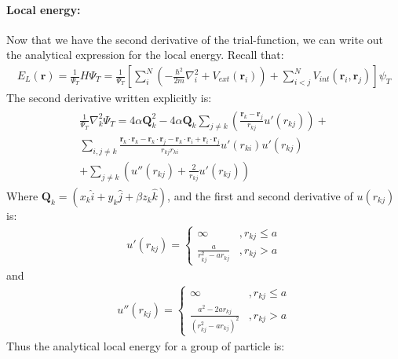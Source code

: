 \documentclass[a4paper, 10pt]{article}
\begin{document}
\begin{appendices}
		\paragraph{Local energy:} Now that we have the second derivative of the
		trial-function, we can write out the analytical expression for the local energy.
		Recall that:
		\begin{align}
		E_{L}(\boldsymbol{r}) = \frac{1}{\Psi_{T}}H\Psi_{T} =
		\frac{1}{\Psi_{T}}\left[\sum_{i}^{N}\left(-\frac{\hbar^{2}}{2m}\nabla^{2}_{i}
		+ V_{ext}(\boldsymbol{r}_{i})\right) + \sum_{i < j}^{N}V_{int}(
		\boldsymbol{r}_{i},\boldsymbol{r}_{j})\right]\psi_{T}
		\end{align}
		The second derivative written explicitly is:
		\begin{align}
		\begin{split}
		\frac{1}{\Psi_{T}}\nabla^{2}_{k}\Psi_{T} = 4\alpha\boldsymbol{Q}_{k}^{2} - 4\alpha\boldsymbol{Q}_{k}
		\sum_{j\neq k}\left(\frac{\boldsymbol{r}_{k} - \boldsymbol{r}_{j}}{r_{kj}}u'(r_{kj})\right)
		+\\
		\sum_{i,j\neq k}\frac{\boldsymbol{r}_{k}\cdot\boldsymbol{r}_{k} - \boldsymbol{r}_{k}\cdot\boldsymbol{r}_{j} - \boldsymbol{r}_{k}\cdot\boldsymbol{r}_{i} + \boldsymbol{r}_{i}\cdot\boldsymbol{r}_{j}}{r_{kj}r_{ki}}u'(r_{ki})u'(r_{kj})
		\\
		+ \sum_{j \neq k}\left(u''(r_{kj}) + \frac{2}{r_{kj}}u'(r_{kj})\right)
		\end{split}
		\end{align}
		Where $\boldsymbol{Q}_{k} = \left(x_{k}\hat{i} + y_{k}\hat{j} + \beta z_{k}\hat{k}\right)$,
		and the first and second derivative of $u(r_{kj})$ is:
		\begin{align}
		u'(r_{kj}) =
		\begin{cases}
		\infty &, r_{kj} \le a\\
		\frac{a}{r_{kj}^{2} - ar_{kj}} &, r_{kj} > a
		\end{cases}
		\label{udiv}
		\end{align}
		and
		\begin{align}
		u''(r_{kj}) =
		\begin{cases}
		\infty &, r_{kj} \le a\\
		\frac{a^{2} - 2ar_{kj}}{\left(r_{kj}^{2} - ar_{kj}\right)^{2}} &, r_{kj} > a
		\end{cases}
		\label{udivdiv}
		\end{align}
		Thus the analytical local energy for a group of particle is:
		\begin{align}

\end{align}
\end{appendices}
\end{document}
